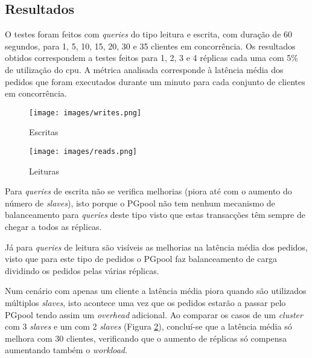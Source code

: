 \subsection{Resultados}
O testes foram feitos com \textit{queries} do tipo leitura e escrita, com duração de 60 segundos, para 1, 5, 10, 15, 20, 30 e 35 clientes em concorrência. Os resultados obtidos correspondem a testes feitos para 1, 2, 3 e 4 réplicas cada uma com 5\% de utilização do cpu.
A métrica analisada corresponde à latência média dos pedidos que foram executados durante um minuto para cada conjunto de clientes em concorrência.

\begin{figure}
    \centering
    \texttt{[image: images/writes.png]}
    \caption{Escritas}
    \label{fig:w}
\end{figure}

\begin{figure}
    \centering
    \texttt{[image: images/reads.png]}
    \caption{Leituras}
    \label{fig:r}
\end{figure}



Para \textit{queries} de escrita não se verifica melhorias (piora até com o aumento do número de \textit{slaves}), isto porque o PGpool não tem nenhum mecanismo de balanceamento para \textit{queries} deste tipo visto que estas transacções têm sempre de chegar a todos as réplicas.

Já para \textit{queries} de leitura são visíveis as melhorias na latência média dos pedidos, visto que para este tipo de pedidos o PGpool faz balanceamento de carga dividindo os pedidos pelas várias réplicas. 

Num cenário com apenas um cliente a latência média piora quando são utilizados múltiplos \textit{slaves}, isto acontece uma vez que os pedidos estarão a passar pelo PGpool tendo assim um \textit{overhead} adicional. 
Ao comparar os casos de um \textit{cluster} com 3 \textit{slaves} e um com 2 \textit{slaves} (Figura \ref{fig:r}), concluí-se que a latência média só melhora com 30 clientes, verificando que o aumento de réplicas só compensa aumentando também o \textit{workload}.

